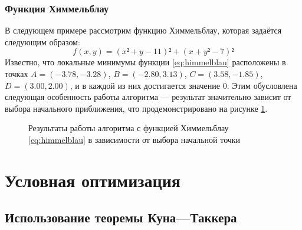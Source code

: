 \documentclass{article}
\theoremstyle{remark}
\theoremstyle{definition}
\numberwithin{equation}{section}
\begin{document}
\subsubsection{Функция Химмельблау}

В следующем примере рассмотрим функцию Химмельблау, которая задаётся
следующим образом:
\begin{equation}
  \label{eq:himmelblau}
  f(x, y) = (x² + y - 11)² + (x + y² - 7)²
\end{equation}
Известно, что локальные минимумы функции \eqref{eq:himmelblau}
расположены в точках $A=(-3.78, -3.28)$, $B=(-2.80, 3.13)$, $C=(3.58,
-1.85)$, $D=(3.00, 2.00)$, и в каждой из них достигается значение $0$.
Этим обусловлена следующая особенность работы алгоритма — результат
значительно зависит от выбора начального приближения, что
продемонстрировано на рисунке \ref{fig:himmelblau}.

\begin{figure}[!thb]
  \centering
  \caption{Результаты работы алгоритма с функцией Химмельблау
    \eqref{eq:himmelblau} в зависимости от выбора начальной точки}
  \label{fig:himmelblau}
\end{figure}

\clearpage
\section{Условная оптимизация}

\subsection{Использование теоремы Куна—Таккера}
\label{sec:kuhn-tucker}
\end{document}
